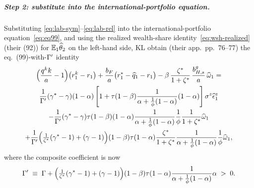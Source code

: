 \subparagraph{Step 2: substitute into the international-portfolio equation.}
Substituting \eqref{eq:lab-sym}--\eqref{eq:lab-rel} into the
international-portfolio equation~\eqref{eq:eq99}, and using the realized
wealth-share identity~\eqref{eq:wsh-realized} (their (92)) for $\mathbb{E}_1\widehat{\theta}_2$
on the left-hand side, KL obtain (their app.~pp.~76--77) the eq.~(99)-with-$\Gamma'$
identity
\begin{multline}
\Bigl(\frac{q^{k} k}{a}-1\Bigr)\bigl(r^{k}_1-r_1\bigr)
+\frac{b_F}{a}\bigl(r^{*}_1-\widehat{q}_1-r_1\bigr)
-\beta\,\frac{\zeta^{*}}{1+\zeta^{*}}\,\frac{b^g_{H,s}}{a}\,\widehat{\omega}_1
=\\
\frac{1}{\Gamma'}(\gamma^{*}-\gamma)(1-\alpha)\left[1+\tau(1-\beta)\frac{1}{\alpha+\frac{1}{\phi}(1-\alpha)}(1-\alpha)\right]\sigma^z\widehat{\epsilon}^z_1\\
-\frac{1}{\Gamma'}(\gamma^{*}-\gamma)\tau(1-\beta)(1-\alpha)\frac{1}{\alpha+\frac{1}{\phi}(1-\alpha)}\frac{1}{\phi}\frac{1}{1+\zeta^{*}}\widehat{\omega}_1\\
+\frac{1}{\Gamma'}\Bigl(\tfrac{1}{\zeta^{*}}(\gamma^{*}-1)+(\gamma-1)\Bigr)(1-\beta)\tau(1-\alpha)\frac{\zeta^{*}}{1+\zeta^{*}}\frac{1}{\alpha+\frac{1}{\phi}(1-\alpha)}\frac{1}{\phi}\widehat{\omega}_1, \label{eq:eq99-prime}
\end{multline}
where the composite coefficient is now
\begin{equation}
\Gamma' \;\equiv\; \Gamma + \Bigl(\tfrac{1}{\zeta^{*}}(\gamma^{*}-1)+(\gamma-1)\Bigr)(1-\beta)\tau(1-\alpha)\frac{1}{\alpha+\frac{1}{\phi}(1-\alpha)}\alpha \;>\;0. \label{eq:Gamma-prime-def}
\end{equation}
